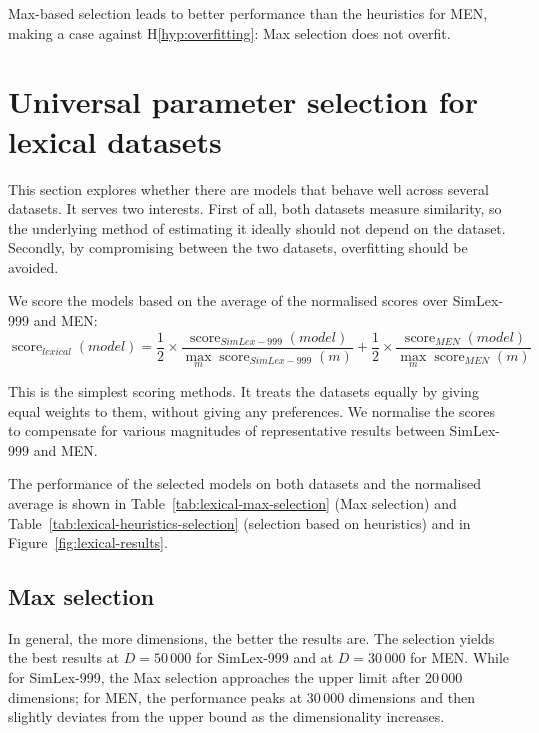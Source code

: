 Max-based selection leads to better performance than the heuristics for MEN, making a case against H\ref{hyp:overfitting}: Max selection does not overfit.

\section{Universal parameter selection for lexical datasets}
\label{sec:universal-lexical-param-selection}



This section explores whether there are models that behave well across several datasets. It serves two interests. First of all, both datasets measure similarity, so the underlying method of estimating it ideally should not depend on the dataset. Secondly, by compromising between the two datasets, overfitting should be avoided.

We score the models based on the average of the normalised scores over SimLex-999 and MEN:
\begin{equation}
\operatorname{score}_\mathit{lexical}(\mathit{model}) =%
\frac{1}{2}\times%
\frac{\operatorname{score}_\mathit{SimLex-999}(\mathit{model})}%
{\max_m\operatorname{score}_\mathit{SimLex-999}(m)}%
+%
\frac{1}{2}\times%
\frac{\operatorname{score}_\mathit{MEN}(\mathit{model})}%
{\max_m\operatorname{score}_\mathit{MEN}(m)}%
\end{equation}

This is the simplest scoring methods. It treats the datasets equally by giving equal weights to them, without giving any preferences. We normalise the scores to compensate for various magnitudes of representative results between SimLex-999 and MEN.

The performance of the selected models on both datasets and the normalised average is shown in Table~\ref{tab:lexical-max-selection} (Max selection) and Table~\ref{tab:lexical-heuristics-selection} (selection based on heuristics) and in Figure~\ref{fig:lexical-results}.



\subsection{Max selection}
\label{sec:max-selection}

In general, the more dimensions, the better the results are. The selection yields the best results at $D = 50\,000$ for SimLex-999 and at $D = 30\,000$ for MEN. While for SimLex-999, the Max selection approaches the upper limit after 20\,000 dimensions; for MEN, the performance peaks at 30\,000 dimensions and then slightly deviates from the upper bound as the dimensionality increases.

